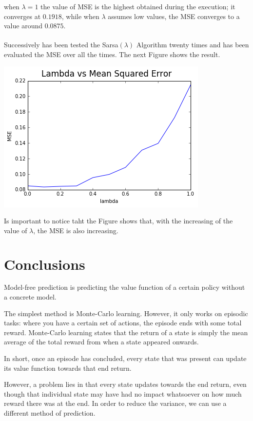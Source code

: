 \documentclass[11pt]{article}
\theoremstyle{plain}
\theoremstyle{definition}
\begin{document}
 when $\lambda=1$ the value of MSE is the highest obtained during the execution; it converges at $0.1918$, while when $\lambda$ assumes low values, the MSE converges to a value around $0.0875$.
\\
\\
Successively has been tested the Sarsa$(\lambda)$ Algorithm twenty times and has been evaluated the MSE over all the times. The next Figure shows the result.

\begin{center}
\includegraphics[scale=0.7]{20_mse}
\end{center}

Is important to notice taht the Figure shows that, with the increasing of the value of $\lambda$, the MSE is also increasing.
\section{Conclusions}
Model-free prediction is predicting the value function of a certain policy without a concrete model.

The simplest method is Monte-Carlo learning. However, it only works on episodic tasks: where you have a certain set of actions, the episode ends with some total reward. Monte-Carlo learning states that the return of a state is simply the mean average of the total reward from when a state appeared onwards.

In short, once an episode has concluded, every state that was present can update its value function towards that end return.

However, a problem lies in that every state updates towards the end return, even though that individual state may have had no impact whatsoever on how much reward there was at the end. In order to reduce the variance, we can use a different method of prediction.
\end{document}
